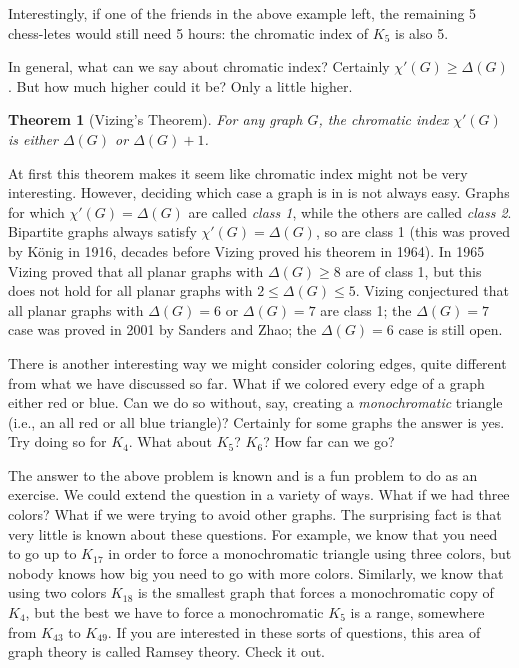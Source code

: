 \documentclass[10pt,]{book}
\theoremstyle{plain}
\newtheorem{theorem}{Theorem}[section]
\theoremstyle{definition}
\theoremstyle{definition}
\theoremstyle{definition}
\theoremstyle{definition}
\numberwithin{equation}{chapter}
\begin{document}
\hypertarget{p-342}{}%
Interestingly, if one of the friends in the above example left, the remaining 5 chess-letes would still need 5 hours: the chromatic index of \(K_5\) is also 5.%
\par
\hypertarget{p-343}{}%
In general, what can we say about chromatic index? Certainly \(\chi'(G) \ge \Delta(G)\). But how much higher could it be? Only a little higher.%
\begin{theorem}[{Vizing's Theorem}]\label{theorem-9}
\hypertarget{p-344}{}%
 For any graph \(G\), the chromatic index \(\chi'(G)\) is either \(\Delta(G)\) or \(\Delta(G) + 1\).%
\end{theorem}
\hypertarget{p-345}{}%
At first this theorem makes it seem like chromatic index might not be very interesting. However, deciding which case a graph is in is not always easy. Graphs for which \(\chi'(G) = \Delta(G)\) are called \emph{class 1}, while the others are called \emph{class 2}. Bipartite graphs always satisfy \(\chi'(G) = \Delta(G)\), so are class 1 (this was proved by König in 1916, decades before Vizing proved his theorem in 1964). In 1965 Vizing proved that all planar graphs with \(\Delta(G) \ge 8\) are of class 1, but this does not hold for all planar graphs with \(2 \le \Delta(G) \le 5\). Vizing conjectured that all planar graphs with \(\Delta(G) = 6\) or \(\Delta(G) = 7\) are class 1; the \(\Delta(G) = 7\) case was proved in 2001 by Sanders and Zhao; the \(\Delta(G) = 6\) case is still open.%
\par
\hypertarget{p-346}{}%
There is another interesting way we might consider coloring edges, quite different from what we have discussed so far. What if we colored every edge of a graph either red or blue. Can we do so without, say, creating a \emph{monochromatic} triangle (i.e., an all red or all blue triangle)? Certainly for some graphs the answer is yes. Try doing so for \(K_4\). What about \(K_5\)? \(K_6\)? How far can we go?%
\par
\hypertarget{p-347}{}%
The answer to the above problem is known and is a fun problem to do as an exercise. We could extend the question in a variety of ways. What if we had three colors? What if we were trying to avoid other graphs. The surprising fact is that very little is known about these questions. For example, we know that you need to go up to \(K_{17}\) in order to force a monochromatic triangle using three colors, but nobody knows how big you need to go with more colors. Similarly, we know that using two colors \(K_{18}\) is the smallest graph that forces a monochromatic copy of \(K_4\), but the best we have to force a monochromatic \(K_{5}\) is a range, somewhere from \(K_{43}\) to \(K_{49}\). If you are interested in these sorts of questions, this area of graph theory is called Ramsey theory. Check it out.%
\typeout{************************************************}
\typeout{************************************************}
\end{document}
